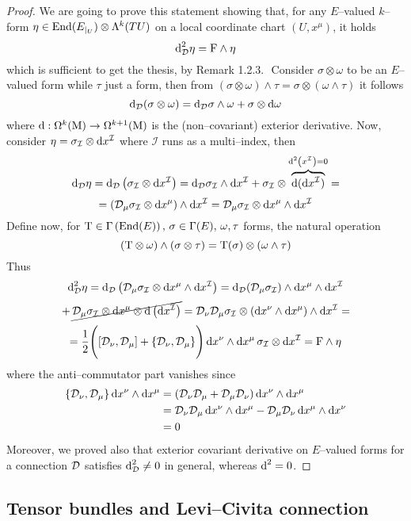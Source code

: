 \begin{proof}
    We are going to prove this statement showing that, for any $E$--valued $k$--form $\eta\in\End(E\ristr{U})\otimes\Lambda^k(TU)$ on a local coordinate chart $(U,x^\mu)$, it holds
    $$\d_\D^2 \eta=\F\wedge\eta$$
    which is sufficient to get the thesis, by Remark 1.2.3.\,\, Consider $\sigma\otimes\omega$ to be an $E$--valued form while $\tau$ just a form, then from $(\sigma\otimes\omega)\wedge\tau=\sigma\otimes(\omega\wedge\tau)$ it follows
    $$\d_\D(\sigma\otimes\omega)=\d_\D\sigma\wedge\omega+\sigma\otimes\d\omega$$
    where $\d:\Omega^k(\M)\to\Omega^{k+1}(\M)$ is the (non--covariant) exterior derivative. Now, consider $\eta=\sigma_{\mathcal{I}}\otimes\d x^{\mathcal{I}}$ where $\mathcal{I}$ runs as a multi--index, then
    $$\d_\D\eta=\d_\D\left(\sigma_{\mathcal{I}}\otimes\d x^{\mathcal{I}}\right)=\d_\D\sigma_{\mathcal{I}}\wedge\d x^{\mathcal{I}}+\sigma_{\mathcal{I}}\otimes\overbrace{\d(\d x^{\mathcal{I}})}^{\d^2\left(x^{\mathcal{I}}\right)=0}=$$
    $$=\left(\D_\mu\sigma_{\mathcal{I}}\otimes\d x^\mu\right)\wedge\d x^{\mathcal{I}}=\D_\mu\sigma_{\mathcal{I}}\otimes\d x^\mu\wedge\d x^{\mathcal{I}}$$
    Define now, for $\T\in\Sec{\End(E)},\,\sigma\in\Gamma(E),\,\omega,\tau$ forms, the natural operation
    $$(\T\otimes\omega)\wedge(\sigma\otimes\tau)=\T(\sigma)\otimes(\omega\wedge\tau)$$
    Thus
    $$\d_\D^2\eta=\d_\D\left(\D_\mu\sigma_{\mathcal{I}}\otimes\d x^\mu\wedge\d x^{\mathcal{I}}\right)=\d_\D(\D_\mu\sigma_{\mathcal{I}})\wedge\d x^\mu\wedge\d x^{\mathcal{I}}$$
    $$+\,\cancel{\D_\mu\sigma_{\mathcal{I}}\otimes\d x^\mu \otimes\d\left(\d x^{\mathcal{I}}\right)}=\D_\nu\D_\mu\sigma_{\mathcal{I}}\otimes(\d x^\nu\wedge\d x^\mu)\wedge\d x^{\mathcal{I}}=$$
    $$=\frac{1}{2}\Biggl([\D_\nu,\D_\mu]+\{\D_\nu,\D_\mu\}\Biggl)\,\d x^\nu\wedge\d x^\mu\,\sigma_{\mathcal{I}}\otimes\d x^{\mathcal{I}}=\F\wedge\eta$$
    where the anti--commutator part vanishes since 
    \begin{align*}
      \{\D_\nu,\D_\mu\}\,\d x^\nu\wedge\d x^\mu&=(\D_\nu\D_\mu+\D_\mu\D_\nu)\,\d x^\nu\wedge\d x^\mu\\
      &=\D_\nu\D_\mu\,\d x^\nu\wedge\d x^\mu-\D_\mu\D_\nu\,\d x^\mu\wedge\d x^\nu\\
      &=0  
    \end{align*}
Moreover, we proved also that exterior covariant derivative on $E$--valued forms for a connection $\D$ satisfies $\d^2_\D\neq0$ in general, whereas $\d^2=0$.
\end{proof}

\subsection{Tensor bundles and Levi--Civita connection}\label{tensor_theory}

